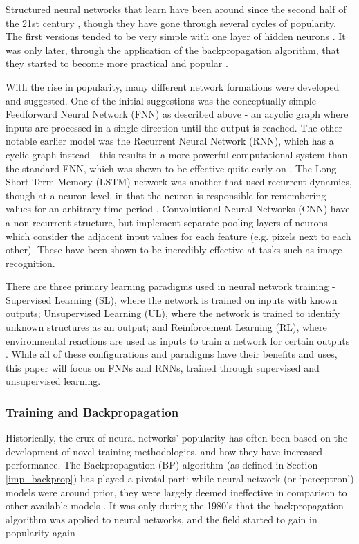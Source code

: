 \documentclass[a4paper,11pt,oneside]{article}
\theoremstyle{plain}
\theoremstyle{definition}
\begin{document}
	Structured neural networks that learn have been around since the second half of the 21st 
	century \citep{Schmidhuber}, though they have gone through several cycles of popularity. The first versions tended to be very simple 
	with one layer of hidden neurons \citep{Ivakhnenko}. It was only later, through the application of 
	the backpropagation algorithm, that they started to become more practical and popular \citep{Werbos}.
	\hfill \break 
	
	With the rise in popularity, many different network formations were developed and suggested. One of the initial 
	suggestions was the conceptually simple Feedforward Neural Network (FNN) as described above - an acyclic
	graph where inputs are processed in a single direction until the output is reached. The other notable earlier model 
	was the Recurrent Neural Network (RNN), which has a cyclic graph instead - this results in a more powerful 
	computational system than the standard FNN, which was shown to be effective quite early on 
	\citep{Siegelmann}. The Long Short-Term Memory (LSTM) network was 
	another that used recurrent dynamics, though at a neuron level, in that the neuron is responsible for remembering 
	values for an arbitrary time period \citep{Hochreiter}. Convolutional Neural Networks (CNN) have a non-recurrent structure, 
	but implement separate pooling layers of neurons which consider the adjacent input values for each feature 
	(e.g. pixels next to each other). These have been shown to be incredibly effective at tasks such as image 
	recognition.
	\hfill \break 
	
	There are three primary learning paradigms used in neural network training - Supervised Learning (SL), 
	where the network is trained on inputs with known outputs; Unsupervised Learning (UL), where the network is 
	trained to identify unknown structures as an output; and Reinforcement Learning (RL), where environmental
	reactions are used as inputs to train a network for certain outputs \citep{Schmidhuber}. While all of these configurations and paradigms 
	have their benefits and uses, this paper will focus on FNNs and RNNs, trained through supervised and unsupervised learning.
	\hfill \break 
	
	\subsubsection{Training and Backpropagation}\label{lr_trainingbackprop}
	
	Historically, the crux of neural networks' popularity has often been based on the development of novel training 
	methodologies, and how they have increased performance. The Backpropagation (BP) algorithm (as defined in Section \ref{imp_backprop})
	has played a pivotal part: while neural network (or `perceptron') models were around prior, 
	they were largely deemed ineffective  in comparison to other available models \citep{Minksy}. It was only during the 1980's that the backpropagation algorithm was applied to neural networks, and 
	the field started to gain in popularity again \citep{LeCun2, Werbos2}. 
	\hfill \break 
	
\end{document}
